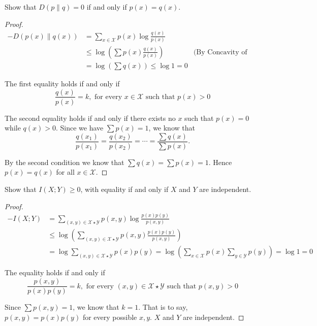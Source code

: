 \begin{exercise} {Show that $D(p \| q)=0$ if and only if $p(x)=q(x)$.}
\begin{proof}
\begin{equation}
  \begin{aligned}
    - D(p(x)\| q(x)) &= \sum_{x\in \mathcal{X}} p(x) \log \frac{q(x)}{p(x)} & \\
    &\le \log(\sum p(x) \frac{q(x)}{p(x)}) & \text{(By Concavity of log(x))} \\
    &= \log(\sum q(x)) \le \log 1 = 0  &
  \end{aligned}
\end{equation}

The first equality holds if and only if $$\frac{q(x)}{p(x)}=k, \text{ for every } x \in \mathcal{X} \text{ such that } p(x)>0 $$

The second equality holds if and only if there exists no $x$ such that $p(x)=0$ while $q(x)>0$. 
Since we have $\sum p(x) = 1$, we know that $$\frac{q(x_1)}{p(x_1)} = \frac{q(x_2)}{p(x_2)} = \cdots = \frac{\sum{q(x)}}{\sum p(x)}. $$

By the second condition we know that $\sum q(x) = \sum p(x) = 1$. Hence $p(x) = q(x)$ for all $x\in \mathcal{X}$.

\end{proof}
\label{ex2-1}
\end{exercise}


\begin{exercise} {Show that $I(X;Y) \ge 0$, with equality if and only if $X$ and $Y$ are independent.}
\begin{proof}
\begin{equation}
  \begin{aligned}
    -I(X;Y) &= \sum_{(x,y)\in \mathcal{X}\star \mathcal{Y}} p(x,y) \log {\frac{p(x)p(y)}{p(x,y)}} \\
    &\le \log \left( \sum_{(x,y)\in \mathcal{X} \star \mathcal{Y}} p(x,y) \frac{p(x)p(y)}{p(x,y)}\right) \\
    &=  \log{ \sum_{(x,y)\in \mathcal{X} \star \mathcal{Y} } {p(x)p(y)}} = \log \left(\sum_{x\in \mathcal{X}}p(x) \sum_{y \in \mathcal{Y}} p(y) \right) = \log 1 = 0
  \end{aligned}
\end{equation}

The equality holds if and only if $$\frac{p(x,y)}{p(x)p(y)}=k, \text{ for every } (x,y) \in \mathcal{X} \star \mathcal{Y} \text{ such that } p(x,y)>0$$

Since $\sum p(x,y) = 1$, we know that $k=1$. That is to say, $p(x,y) = p(x)p(y)$ for every possible $x,y$. $X$ and $Y$ are independent.

\end{proof}
\label{ex2-2}
\end{exercise}


